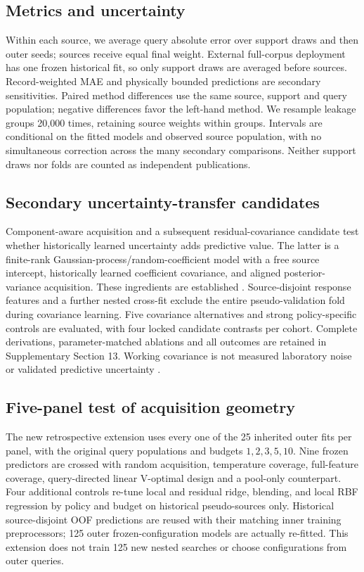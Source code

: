 \documentclass[11pt]{article}
\begin{document}
\subsection{Metrics and uncertainty}
Within each source, we average query absolute error over support draws and then outer seeds; sources receive equal final weight. External full-corpus deployment has one frozen historical fit, so only support draws are averaged before sources. Record-weighted MAE and physically bounded predictions are secondary sensitivities. Paired method differences use the same source, support and query population; negative differences favor the left-hand method. We resample leakage groups 20,000 times, retaining source weights within groups. Intervals are conditional on the fitted models and observed source population, with no simultaneous correction across the many secondary comparisons. Neither support draws nor folds are counted as independent publications.

\subsection{Secondary uncertainty-transfer candidates}
Component-aware acquisition and a subsequent residual-covariance candidate test whether historically learned uncertainty adds predictive value. The latter is a finite-rank Gaussian-process/random-coefficient model with a free source intercept, historically learned coefficient covariance, and aligned posterior-variance acquisition. These ingredients are established \cite{gpml,alpaca,gpmllearn,scaml}. Source-disjoint response features and a further nested cross-fit exclude the entire pseudo-validation fold during covariance learning. Five covariance alternatives and strong policy-specific controls are evaluated, with four locked candidate contrasts per cohort. Complete derivations, parameter-matched ablations and all outcomes are retained in Supplementary Section 13. Working covariance is not measured laboratory noise or validated predictive uncertainty \cite{iwata}.

\subsection{Five-panel test of acquisition geometry}
The new retrospective extension uses every one of the 25 inherited outer fits per panel, with the original query populations and budgets $1,2,3,5,10$. Nine frozen predictors are crossed with random acquisition, temperature coverage, full-feature coverage, query-directed linear V-optimal design and a pool-only counterpart. Four additional controls re-tune local and residual ridge, blending, and local RBF regression by policy and budget on historical pseudo-sources only. Historical source-disjoint OOF predictions are reused with their matching inner training preprocessors; 125 outer frozen-configuration models are actually re-fitted. This extension does not train 125 new nested searches or choose configurations from outer queries.
\end{document}
